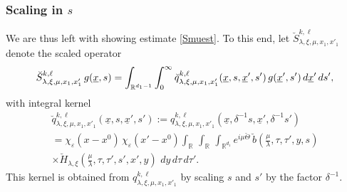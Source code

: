 \documentclass[leqno]{amsart}
\theoremstyle{definition}
\theoremstyle{remark}
\numberwithin{equation}{section}
\newcommand{\R}{\mathbb{R}}
\newcommand\la{{\lambda}}
\begin{document}
\subsubsection{Scaling in $s$}\label{scaletrick}

We are thus left with showing estimate \eqref{Smuest}.
To this end, let $\breve S_{\lambda,\xi,\mu,x_1,x'_1}^{k,\ell}$ denote the scaled operator
\[
\breve S_{\lambda,\xi,\mu,x_1,x'_1}^{k,\ell} \, g(\underline x,s) \\
 = \int_{\R^{d_1-1}} \int_0^\infty \breve q^{k,\ell}_{\lambda,\xi,\mu,x_1,x'_1}(\underline x,s,\underline x',s') \, g(\underline x',s') \, d\underline x' \, ds',
\]
with integral kernel
\begin{multline*}
\breve q^{k,\ell}_{\lambda,\xi,\mu,x_1,x'_1}(\underline x,s,\underline x',s')
:=q^{k,\ell}_{\lambda,\xi,\mu,x_1,x'_1}(\underline x,\delta^{-1}s,\underline x',\delta^{-1}s')\\
= \chi_\varepsilon(x-x^0)\,
\chi_\varepsilon(x'-x^0)  \int_\R\, \int_\R\, \int_{\R^{d_1}}
e^{i\mu\breve\Theta}\,
\breve b(\tfrac\mu\la,\tau,\tau',y,s)\\
\times \breve H_{\la,\xi}
(\tfrac\mu\la,\tau,\tau',s',x',y)\,
\, dy \, d\tau \, d\tau'.
\end{multline*}
This kernel is obtained from $q^{k,\ell}_{\lambda,\xi,\mu,x_1,x'_1}$ by scaling $s$ and $s'$ by the factor $\delta^{-1}.$
\end{document}
